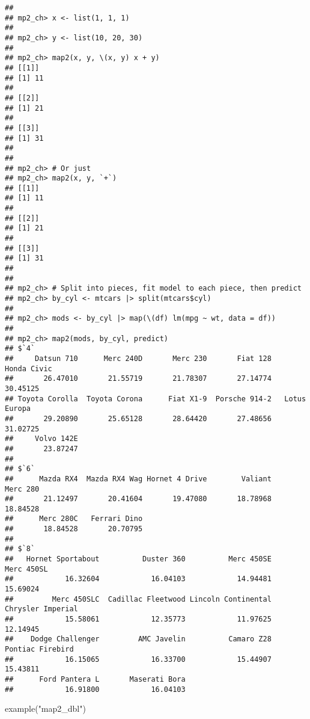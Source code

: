 \documentclass[
]{book}
\newenvironment{Shaded}{\begin{snugshade}}{\end{snugshade}}
\newcommand{\FunctionTok}[1]{\textcolor[rgb]{0.00,0.00,0.00}{#1}}
\newcommand{\NormalTok}[1]{#1}
\newcommand{\StringTok}[1]{\textcolor[rgb]{0.31,0.60,0.02}{#1}}
\begin{document}
\begin{verbatim}
## 
## mp2_ch> x <- list(1, 1, 1)
## 
## mp2_ch> y <- list(10, 20, 30)
## 
## mp2_ch> map2(x, y, \(x, y) x + y)
## [[1]]
## [1] 11
## 
## [[2]]
## [1] 21
## 
## [[3]]
## [1] 31
## 
## 
## mp2_ch> # Or just
## mp2_ch> map2(x, y, `+`)
## [[1]]
## [1] 11
## 
## [[2]]
## [1] 21
## 
## [[3]]
## [1] 31
## 
## 
## mp2_ch> # Split into pieces, fit model to each piece, then predict
## mp2_ch> by_cyl <- mtcars |> split(mtcars$cyl)
## 
## mp2_ch> mods <- by_cyl |> map(\(df) lm(mpg ~ wt, data = df))
## 
## mp2_ch> map2(mods, by_cyl, predict)
## $`4`
##     Datsun 710      Merc 240D       Merc 230       Fiat 128    Honda Civic 
##       26.47010       21.55719       21.78307       27.14774       30.45125 
## Toyota Corolla  Toyota Corona      Fiat X1-9  Porsche 914-2   Lotus Europa 
##       29.20890       25.65128       28.64420       27.48656       31.02725 
##     Volvo 142E 
##       23.87247 
## 
## $`6`
##      Mazda RX4  Mazda RX4 Wag Hornet 4 Drive        Valiant       Merc 280 
##       21.12497       20.41604       19.47080       18.78968       18.84528 
##      Merc 280C   Ferrari Dino 
##       18.84528       20.70795 
## 
## $`8`
##   Hornet Sportabout          Duster 360          Merc 450SE          Merc 450SL 
##            16.32604            16.04103            14.94481            15.69024 
##         Merc 450SLC  Cadillac Fleetwood Lincoln Continental   Chrysler Imperial 
##            15.58061            12.35773            11.97625            12.14945 
##    Dodge Challenger         AMC Javelin          Camaro Z28    Pontiac Firebird 
##            16.15065            16.33700            15.44907            15.43811 
##      Ford Pantera L       Maserati Bora 
##            16.91800            16.04103
\end{verbatim}

\begin{Shaded}
\begin{Highlighting}[]
\FunctionTok{example}\NormalTok{(}\StringTok{"map2\_dbl"}\NormalTok{)}
\end{Highlighting}
\end{Shaded}
\end{document}
